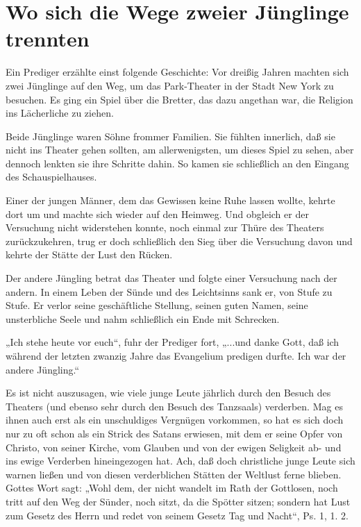 \chapter[Wo sich die Wege zweier Jünglinge]{Wo sich die Wege zweier Jünglinge trennten}

Ein Prediger erzählte einst folgende Geschichte: Vor dreißig Jahren machten sich zwei Jünglinge auf den Weg, um das Park-Theater in der Stadt New York zu besuchen. Es ging ein Spiel über die Bretter, das dazu angethan war, die Religion ins Lächerliche zu ziehen.

Beide Jünglinge waren Söhne frommer Familien. Sie fühlten innerlich, daß sie nicht ins Theater gehen sollten, am allerwenigsten, um dieses Spiel zu sehen, aber dennoch lenkten sie ihre Schritte dahin. So kamen sie schließlich an den Eingang des Schauspielhauses.

Einer der jungen Männer, dem das Gewissen keine Ruhe lassen
wollte, kehrte dort um und machte sich wieder auf den Heimweg. Und obgleich er der Versuchung nicht widerstehen konnte, noch einmal zur Thüre des Theaters zurückzukehren, trug er doch schließlich den Sieg über die Versuchung davon und kehrte der Stätte der Lust den Rücken.

Der andere Jüngling betrat das Theater und folgte einer Versuchung nach der andern. In einem Leben der Sünde und des Leichtsinns sank er, von Stufe zu Stufe. Er verlor seine geschäftliche Stellung, seinen guten Namen, seine unsterbliche Seele und nahm schließlich ein Ende mit Schrecken.

„Ich stehe heute vor euch“, fuhr der Prediger fort, „...und danke Gott, daß ich während der letzten zwanzig Jahre das Evangelium predigen durfte. Ich war der andere Jüngling.“

Es ist nicht auszusagen, wie viele junge Leute jährlich durch den Besuch des Theaters (und ebenso sehr durch den Besuch des Tanzsaals) verderben. Mag es ihnen auch erst als ein unschuldiges Vergnügen vorkommen, so hat es sich doch nur zu oft schon als ein Strick des Satans erwiesen, mit dem er seine Opfer von Christo, von seiner Kirche, vom Glauben und von der ewigen Seligkeit ab- und ins ewige Verderben hineingezogen hat. Ach, daß doch christliche junge Leute sich warnen ließen und von diesen verderblichen Stätten der Weltlust ferne blieben. Gottes Wort sagt: „Wohl dem, der nicht wandelt im Rath der Gottlosen, noch tritt auf den Weg der Sünder, noch sitzt, da die Spötter sitzen; sondern hat Lust zum Gesetz des Herrn und redet von seinem Gesetz Tag und Nacht“, Ps. 1, 1. 2.
